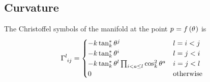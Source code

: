 \documentclass[../main.tex]{subfiles}
\begin{document}
\subsection{Curvature}
\begin{lemma}\label{M:Christoffel}
    The Christoffel symbols of the manifold
    at the point $\tensor{p}{}=f\left(\tensor{\theta}{}\right)$
    is
    \begin{equation*}
        \tensor{\Gamma}{^l_i_j}= \begin{cases}
            -k\tan_k^\ast\tensor{\theta}{^j} & \text{$l=i<j$} \\
            -k\tan_k^\ast\tensor{\theta}{^i} & \text{$l=j<i$} \\
            -k\tan_k^\ast\tensor{\theta}{^l}\prod_{i<a\le l}{\cos_k^2\tensor{\theta}{^a}} & \text{$i=j<l$} \\
            0 & \text{otherwise} \\
        \end{cases}
    \end{equation*}
\end{lemma}
\end{document}
